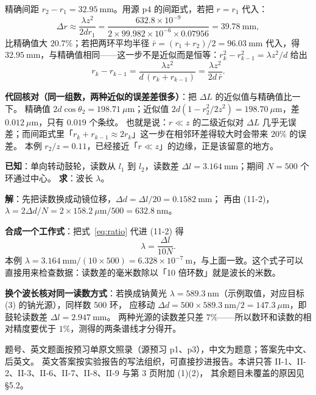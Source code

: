 \documentclass[11pt]{ctexart}
\newcommand{\Dl}{d}
\begin{document}
精确间距 $r_2-r_1=32.95\ \mathrm{mm}$。用源 p4 的间距式，若把 $r=r_1$ 代入：
\[
  \Delta r\approx\frac{\lambda z^2}{2\Dl r_1}=\frac{632.8\times10^{-9}}{2\times99.982\times10^{-6}\times0.07956}=39.78\ \mathrm{mm},
\]
比精确值大 $20.7\%$；若把两环平均半径 $\bar r=(r_1+r_2)/2=96.03\ \mathrm{mm}$ 代入，得 $32.95\ \mathrm{mm}$，与精确值相同——这一步不是近似而是恒等：$r_k^2-r_{k-1}^2=\lambda z^2/\Dl$ 给出
\[
  r_k-r_{k-1}=\frac{\lambda z^2}{\Dl\,(r_k+r_{k-1})}=\frac{\lambda z^2}{2\Dl\,\bar r}.
\]

\textbf{代回核对（同一组数，两种近似的误差差很多）}：把 $\Delta L$ 的近似值与精确值比一下。
精确值 $2\Dl\cos\theta_2=198.71\ \mu\mathrm{m}$；近似值 $2\Dl(1-r_2^2/2z^2)=198.70\ \mu\mathrm{m}$，差 $0.012\ \mu\mathrm{m}$，只有 $0.019$ 个条纹。
也就是说：$r\ll z$ 的二级近似对 $\Delta L$ 几乎无误差；而间距式里「$r_k+r_{k-1}\approx2r_k$」这一步在相邻环差得较大时会带来 $20\%$ 的误差。
本例 $r_2/z=0.11$，已经接近「$r\ll z$」的边缘，正是该留意的地方。


\textbf{已知}：单向转动鼓轮，读数从 $l_1$ 到 $l_2$，读数差 $\Delta l=3.164\ \mathrm{mm}$；期间 $N=500$ 个环通过中心。
\textbf{求}：波长 $\lambda$。

\textbf{解}：先把读数换成动镜位移，$\Delta\Dl=\Delta l/20=0.1582\ \mathrm{mm}$；
再由 (11-2)，$\lambda=2\Delta\Dl/N=2\times158.2\ \mu\mathrm{m}/500=632.8\ \mathrm{nm}$。

\textbf{合成一个工作式}：把式~\eqref{eq:ratio} 代进 (11-2) 得
\[
  \lambda=\frac{\Delta l}{10N}.
\]
本例 $\lambda=3.164\ \mathrm{mm}/(10\times500)=6.328\times10^{-7}\ \mathrm{m}$，与上面一致。这个式子可以直接用来检查数据：读数差的毫米数除以「10 倍环数」就是波长的米数。

\textbf{换个波长核对同一读数方式}：若换成钠黄光 $\lambda=589.3\ \mathrm{nm}$（示例取值，对应目标 (3) 的钠光源），同样数 500 环，
应移动 $\Delta\Dl=500\times589.3\ \mathrm{nm}/2=147.3\ \mu\mathrm{m}$，即鼓轮读数差 $\Delta l=2.947\ \mathrm{mm}$。
两种光源的读数差只差 $7\%$——所以数环和读数的相对精度要优于 $1\%$，测得的两条谱线才分得开。


题号、英文题面按预习单原文照录（源预习 p1、p3），中文为题意；答案先中文、后英文。
英文答案按实验报告的写法组织，可直接抄进报告。本讲只答 II-1、II-2、II-3、II-6、II-7、II-8、II-9 与第 3 页附加 (1)(2)，
其余题目未覆盖的原因见 §5.2。
\end{document}
